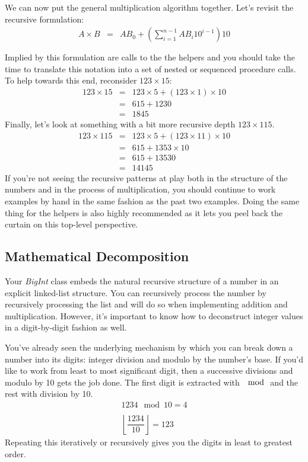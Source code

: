 \documentclass[10pt]{article}
\begin{document}
We can now put the general multiplication algorithm together. Let's revisit the recursive formulation:
\[
\begin{array}{rcl}
A \times B &=& AB_0 + \left(\sum\limits_{i=1}^{n-1}AB_i10^{i-1}\right)10 \\ \\ 
\end{array}
\] 
Implied by this formulation are calls to the the helpers and you should take the time to translate this notation into a set of nested or sequenced procedure calls. To help towards this end, reconsider $123 \times 15$:
\[
\begin{array}{rcl}
123 \times 15 &=& 123\times 5 + (123\times 1)\times 10 \\
 &=& 615 + 1230 \\
 &=& 1845
\end{array}
\]
Finally, let's look at something with a bit more recursive depth $123 \times 115$.
\[
\begin{array}{rcl}
123 \times 115 &=& 123\times 5 + (123\times 11)\times 10 \\
 &=& 615 + 1353 \times 10 \\
 &=& 615 + 13530 \\
 &=& 14145
\end{array}
\]
If you're not seeing the recursive patterns at play both in the structure of the numbers and in the process of multiplication, you should continue to work examples by hand in the same fashion as the past two examples. Doing the same thing for the helpers is also highly recommended as it lets you peel back the curtain on this top-level perspective. 

\subsection*{Mathematical Decomposition}

Your \textit{BigInt} class embeds the natural recursive structure of a number in an explicit linked-list structure. You can recursively process the number by recursively processing the list and will do so when implementing addition and multiplication. However, it's important to know how to deconstruct integer values in a digit-by-digit fashion as well. 

You've already seen the underlying mechanism by which you can break down a number into its digits: integer division and modulo by the number's base. If you'd like to work from least to most significant digit, then a successive divisions and modulo by 10 gets the job done. The first digit is extracted with $\mod$ and the rest with division by 10.
\[
\begin{array}{l}
1234 \mod 10 = 4 \\ \\
\left\lfloor \dfrac{1234}{10} \right\rfloor = 123
\end{array}
\]
Repeating this iteratively or recursively gives you the digits in least to greatest order.
\end{document}
